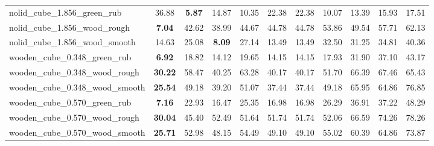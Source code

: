 \begin{table}[H]
{\begin{tabular}{l cccccccccc}
        nolid\_cube\_1.856\_green\_rub & 36.88 & \textbf{5.87} & 14.87 & 10.35 & 22.38 & 22.38 & 10.07 & 13.39 & 15.93 & 17.51 \\
        nolid\_cube\_1.856\_wood\_rough & \textbf{7.04} & 42.62 & 38.99 & 44.67 & 44.78 & 44.78 & 53.86 & 49.54 & 57.71 & 62.13 \\
        nolid\_cube\_1.856\_wood\_smooth & 14.63 & 25.08 & \textbf{8.09} & 27.14 & 13.49 & 13.49 & 32.50 & 31.25 & 34.81 & 40.36 \\
        wooden\_cube\_0.348\_green\_rub & \textbf{6.92} & 18.82 & 14.12 & 19.65 & 14.15 & 14.15 & 17.93 & 31.90 & 37.10 & 43.17 \\
        wooden\_cube\_0.348\_wood\_rough & \textbf{30.22} & 58.47 & 40.25 & 63.28 & 40.17 & 40.17 & 51.70 & 66.39 & 67.46 & 65.43 \\
        wooden\_cube\_0.348\_wood\_smooth & \textbf{25.54} & 49.18 & 39.20 & 51.07 & 37.44 & 37.44 & 49.18 & 65.95 & 64.86 & 76.85 \\
        wooden\_cube\_0.570\_green\_rub & \textbf{7.16} & 22.93 & 16.47 & 25.35 & 16.98 & 16.98 & 26.29 & 36.91 & 37.22 & 48.29 \\
        wooden\_cube\_0.570\_wood\_rough & \textbf{30.04} & 45.40 & 52.49 & 51.64 & 51.74 & 51.74 & 52.06 & 66.59 & 74.26 & 78.26 \\
        wooden\_cube\_0.570\_wood\_smooth & \textbf{25.71} & 52.98 & 48.15 & 54.49 & 49.10 & 49.10 & 55.02 & 60.39 & 64.86 & 73.87 \\
        \bottomrule
    \end{tabular}
    }
\end{table}



\vspace{1cm}

\clearpage

